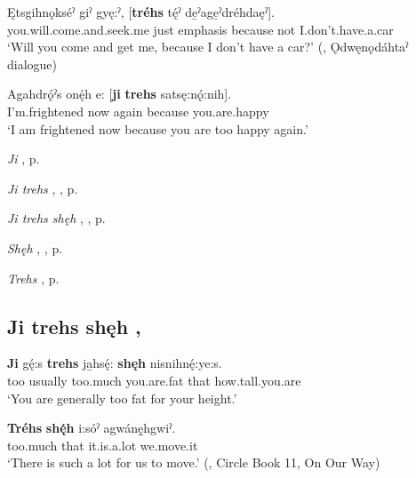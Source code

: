 \ea
\label{ex:jpar7}
\gll Ętsgihnǫkséˀ giˀ gyę:ˀ, [\textbf{tréhs} tę́ˀ de̱ˀage̱ˀdréhdaęˀ]. \\
you.will.come.and.seek.me just emphasis because not I.don’t.have.a.car\\
\glt ‘Will you come and get me, because I don’t have a car?’ (\cite[279]{mithun_watewayestanih_1984}, Ǫdwęnǫdáhtaˀ dialogue)
\z

\ea
\label{ex:jpar8}
\gll Agahdrǫ́ˀs onę́h e:  {[\textbf{ji} \textbf{trehs}} satsę:nǫ́:nih]. \\
I’m.frightened now again because you.are.happy\\
\glt ‘I am frightened now because you are too happy again.’
\z

\begin{CayugaRelated}
\item \textit{Ji} , p. \pageref{p:[ji]}\\
\item \textit{Ji trehs} , , p. \pageref{p:[ji trehs] ‘more (than usual)’}\\
\item \textit{Ji trehs shęh} , , p. \pageref{p:[ji trehs shęh]}\\
\item \textit{Shęh} , , p. \pageref{p:[shęh] `because’}\\
\item \textit{Trehs} , p. \pageref{p:[trehs, ji trehs]}
\end{CayugaRelated}


\subsection*{\textbf{Ji trehs shęh} , } \label{p:[ji trehs shęh]}

\ea
\label{ex:jpar9}
\gll \textbf{Ji} gę́:s \textbf{trehs} ja̱hsę́: \textbf{shęh} nisnihnę́:ye:s. \\
too usually too.much you.are.fat that how.tall.you.are\\
\glt ‘You are generally too fat for your height.’
\z

\ea
\label{ex:jpar10}
\gll \textbf{Tréhs} \textbf{shę́h} i:sóˀ agwánę̱hgwiˀ. \\
too.much that it.is.a.lot we.move.it\\
\glt ‘There is such a lot for us to move.’ (\cite{keye_circle_2016}, Circle Book 11, On Our Way)
\z

